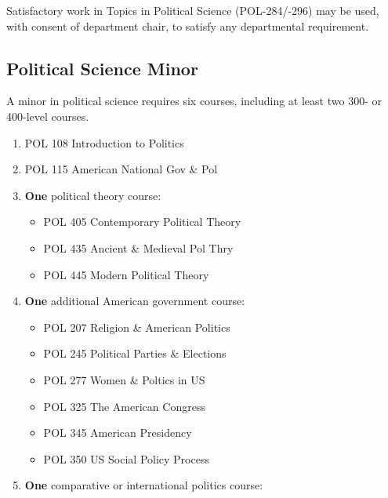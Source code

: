 \documentclass[
  letterpaper,
]{scrbook}
\providecommand{\tightlist}{%
  \setlength{\itemsep}{0pt}\setlength{\parskip}{0pt}}
\begin{document}
Satisfactory work in Topics in Political Science (POL-284/-296) may be
used, with consent of department chair, to satisfy any departmental
requirement.

\subsection{Political Science Minor}\label{political-science-minor}

A minor in political science requires six courses, including at least
two 300- or 400-level courses.

\begin{enumerate}
\def\labelenumi{\arabic{enumi}.}
\item
  POL 108 Introduction to Politics
\item
  POL 115 American National Gov \& Pol
\item
  \textbf{One} political theory course:

  \begin{itemize}
  \tightlist
  \item
    POL 405 Contemporary Political Theory
  \item
    POL 435 Ancient \& Medieval Pol Thry
  \item
    POL 445 Modern Political Theory
  \end{itemize}
\item
  \textbf{One} additional American government course:

  \begin{itemize}
  \tightlist
  \item
    POL 207 Religion \& American Politics
  \item
    POL 245 Political Parties \& Elections
  \item
    POL 277 Women \& Poltics in US
  \item
    POL 325 The American Congress
  \item
    POL 345 American Presidency
  \item
    POL 350 US Social Policy Process
  \end{itemize}
\item
  \textbf{One} comparative or international politics course:


\end{enumerate}
\end{document}
